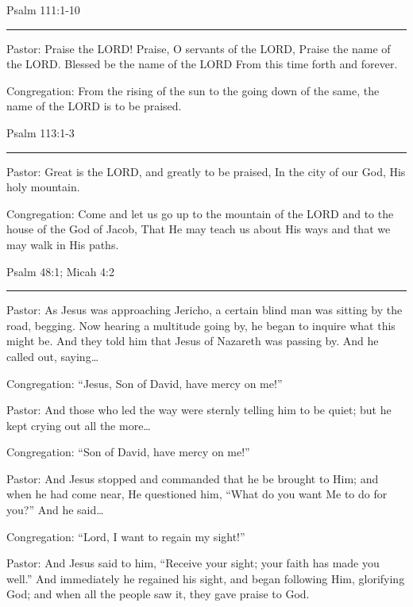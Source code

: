 \documentclass[]{book}
\begin{document}
Psalm 111:1-10 \textbar{}

\begin{center}\rule{0.5\linewidth}{\linethickness}\end{center}

Pastor: Praise the LORD! Praise, O servants of the LORD, Praise the name
of the LORD. Blessed be the name of the LORD From this time forth and
forever.

Congregation: From the rising of the sun to the going down of the same,
the name of the LORD is to be praised.

Psalm 113:1-3 \textbar{}

\begin{center}\rule{0.5\linewidth}{\linethickness}\end{center}

Pastor: Great is the LORD, and greatly to be praised, In the city of our
God, His holy mountain.

Congregation: Come and let us go up to the mountain of the LORD and to
the house of the God of Jacob, That He may teach us about His ways and
that we may walk in His paths.

Psalm 48:1; Micah 4:2 \textbar{}

\begin{center}\rule{0.5\linewidth}{\linethickness}\end{center}

Pastor: As Jesus was approaching Jericho, a certain blind man was
sitting by the road, begging. Now hearing a multitude going by, he began
to inquire what this might be. And they told him that Jesus of Nazareth
was passing by. And he called out, saying\ldots{}

Congregation: ``Jesus, Son of David, have mercy on me!''

Pastor: And those who led the way were sternly telling him to be quiet;
but he kept crying out all the more\ldots{}

Congregation: ``Son of David, have mercy on me!''

Pastor: And Jesus stopped and commanded that he be brought to Him; and
when he had come near, He questioned him, ``What do you want Me to do
for you?'' And he said\ldots{}

Congregation: ``Lord, I want to regain my sight!''

Pastor: And Jesus said to him, ``Receive your sight; your faith has made
you well.'' And immediately he regained his sight, and began following
Him, glorifying God; and when all the people saw it, they gave praise to
God.
\end{document}
